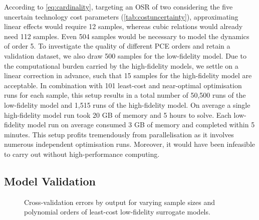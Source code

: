 According to \cref{eq:cardinality}, targeting an OSR of two considering the five uncertain technology cost parameters (\cref{tab:costuncertainty}),
approximating linear effects would require 12 samples, whereas cubic relations
would already need 112 samples. Even 504 samples would be necessary to model the dynamics of order 5.
To investigate the quality of different PCE orders
and retain a validation dataset,
we also draw 500 samples for the low-fidelity model.
Due to the computational burden carried by the high-fidelity models,
we settle on a linear correction in advance, such that
15 samples for the high-fidelity model are acceptable.
In combination with 101 least-cost and near-optimal optimisation
runs for each sample, this setup results in a total number of
50,500 runs of the low-fidelity model and
1,515 runs of the high-fidelity model.
On average a single high-fidelity model run took 20 GB of memory and 5 hours to solve.
Each low-fidelity model run on average consumed 3 GB of memory and completed within 5 minutes. 
This setup profits tremendously from parallelisation as it involves
numerous independent optimisation runs.
Moreover, it would have been infeasible to carry out without high-performance computing.

\subsection{Model Validation}
\label{sec:validation}

\begin{figure}
    \noindent{}
    \noindent{}
    \caption[Cross-validation errors]{Cross-validation errors by output for varying sample sizes and polynomial orders
    of least-cost low-fidelity surrogate models.}
    \label{fig:error}
\end{figure}

